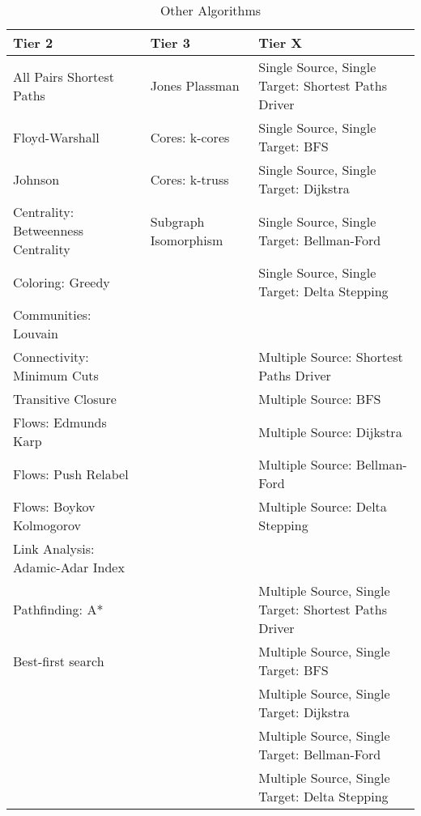 \begin{table}[h!]
\begin{center}
{\begin{tabular}{l|l|l}
\hline
    \textbf{Tier 2} & \textbf{Tier 3} & \textbf{Tier X} \\
\hline
    All Pairs Shortest Paths & Jones Plassman & Single Source, Single Target: Shortest Paths Driver\\
    Floyd-Warshall & Cores: k-cores & Single Source, Single Target: BFS \\
    Johnson & Cores: k-truss & Single Source, Single Target: Dijkstra \\
    Centrality: Betweenness Centrality & Subgraph Isomorphism & Single Source, Single Target: Bellman-Ford \\
    Coloring: Greedy & & Single Source, Single Target: Delta Stepping \\
    Communities: Louvain & &  \\
    Connectivity: Minimum Cuts & & Multiple Source: Shortest Paths Driver \\
    Transitive Closure & & Multiple Source: BFS \\
    Flows: Edmunds Karp & & Multiple Source: Dijkstra \\
    Flows: Push Relabel & & Multiple Source: Bellman-Ford \\
    Flows: Boykov Kolmogorov & & Multiple Source: Delta Stepping \\
    Link Analysis: Adamic-Adar Index & &  \\
    Pathfinding: A* & & Multiple Source, Single Target: Shortest Paths Driver\\
    Best-first search & & Multiple Source, Single Target: BFS \\
    & & Multiple Source, Single Target: Dijkstra \\
    & & Multiple Source, Single Target: Bellman-Ford \\
    & & Multiple Source, Single Target: Delta Stepping \\
\hline
\end{tabular}}
\caption{Other Algorithms}
\label{tab:other_algorithms}
\end{center}
\end{table}


